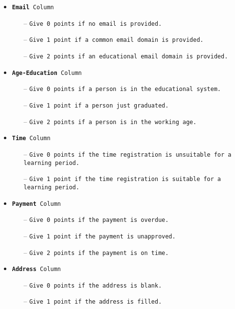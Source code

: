 \begin{itemize}
    \item \texttt{\textbf{Email} Column}
    \begin{itemize}
        \item[--] \texttt{Give 0 points if no email is provided.}
        \item[--] \texttt{Give 1 point if a common email domain is provided.}
        \item[--] \texttt{Give 2 points if an educational email domain is provided.}
    \end{itemize}
    \item \texttt{\textbf{Age-Education} Column}
    \begin{itemize}
        \item[--] \texttt{Give 0 points if a person is in the educational system.}
        \item[--] \texttt{Give 1 point if a person just graduated.}
        \item[--] \texttt{Give 2 points if a person is in the working age.}
    \end{itemize}
    \item \texttt{\textbf{Time} Column}
    \begin{itemize}
        \item[--] \texttt{Give 0 points if the time registration is unsuitable for a learning period.}
        \item[--] \texttt{Give 1 point if the time registration is suitable for a learning period.}
    \end{itemize}
    \item \texttt{\textbf{Payment} Column}
    \begin{itemize}
        \item[--] \texttt{Give 0 points if the payment is overdue.}
        \item[--] \texttt{Give 1 point if the payment is unapproved.}
        \item[--] \texttt{Give 2 points if the payment is on time.}
    \end{itemize}
    \item \texttt{\textbf{Address} Column}
    \begin{itemize}
        \item[--] \texttt{Give 0 points if the address is blank.}
        \item[--] \texttt{Give 1 point if the address is filled.}
    \end{itemize}
\end{itemize}

